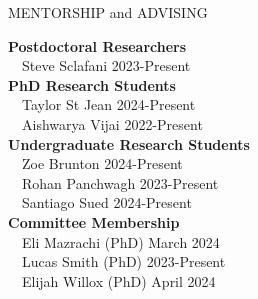 \documentclass{resume} %
\begin{document}
\begin{rSection}{MENTORSHIP and ADVISING}

  \textbf{Postdoctoral Researchers} \\
  \-\ \-\ Steve Sclafani \hfill 2023-Present \\

  \textbf{PhD Research Students} \\
  \-\ \-\ Taylor St Jean \hfill 2024-Present \\
  \-\ \-\ Aishwarya Vijai \hfill 2022-Present \\

  \textbf{Undergraduate Research Students} \\
  \-\ \-\ Zoe Brunton \hfill 2024-Present \\
  \-\ \-\ Rohan Panchwagh \hfill 2023-Present \\
   \-\ \-\ Santiago Sued \hfill 2024-Present \\

  \textbf{Committee Membership} \\
  \-\ \-\ Eli Mazrachi (PhD) \hfill March 2024 \\
  \-\ \-\ Lucas Smith (PhD) \hfill 2023-Present \\
  \-\ \-\ Elijah Willox (PhD) \hfill April 2024 \\

\end{rSection}
\end{document}
